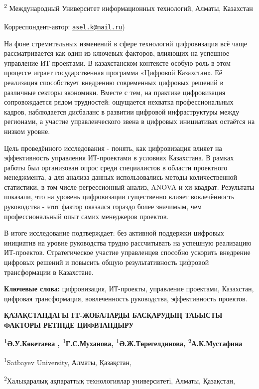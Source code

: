 \textsuperscript{2} Международный Университет информационных технологий,
Алматы, Казахстан

{\bfseries \textsuperscript{\envelope }}Корреспондент-автор:
\href{mailto:asel.k@mail.ru}{\nolinkurl{asel.k@mail.ru}})

На фоне стремительных изменений в сфере технологий цифровизация всё чаще
рассматривается как один из ключевых факторов, влияющих на успешное
управление ИТ-проектами. В казахстанском контексте особую роль в этом
процессе играет государственная программа «Цифровой Казахстан». Её
реализация способствует внедрению современных цифровых решений в
различные секторы экономики. Вместе с тем, на практике цифровизация
сопровождается рядом трудностей: ощущается нехватка профессиональных
кадров, наблюдается дисбаланс в развитии цифровой инфраструктуры между
регионами, а участие управленческого звена в цифровых инициативах
остаётся на низком уровне.

Цель проведённого исследования - понять, как цифровизация влияет на
эффективность управления ИТ-проектами в условиях Казахстана. В рамках
работы был организован опрос среди специалистов в области проектного
менеджмента, а для анализа данных использовались методы количественной
статистики, в том числе регрессионный анализ, ANOVA и хи-квадрат.
Результаты показали, что на уровень цифровизации существенно влияет
вовлечённость руководства - этот фактор оказался гораздо более значимым,
чем профессиональный опыт самих менеджеров проектов.

В итоге исследование подтверждает: без активной поддержки цифровых
инициатив на уровне руководства трудно рассчитывать на успешную
реализацию ИТ-проектов. Стратегическое участие управленцев способно
ускорить внедрение цифровых решений и повысить общую результативность
цифровой трансформации в Казахстане.

{\bfseries Ключевые слова:} цифровизация, ИТ-проекты, управление проектами,
Казахстан, цифровая трансформация, вовлеченность руководства,
эффективность проектов.

{\bfseries ҚАЗАҚСТАНДАҒЫ IT-ЖОБАЛАРДЫ БАСҚАРУДЫҢ ТАБЫСТЫ ФАКТОРЫ РЕТІНДЕ
ЦИФРЛАНДЫРУ}

{\bfseries \textsuperscript{1}Ә.У.Көкетаева\textsuperscript{\envelope } ,
\textsuperscript{1}Г.С.Муханова, \textsuperscript{1}Ә.Ж.Төрегелдинова,
\textsuperscript{2}А.К.Мустафина}

\textsuperscript{1}Satbayev University, Алматы, Қазақстан,

\textsuperscript{2}Халықаралық ақпараттық технологиялар университеті,
Алматы, Қазақстан,

